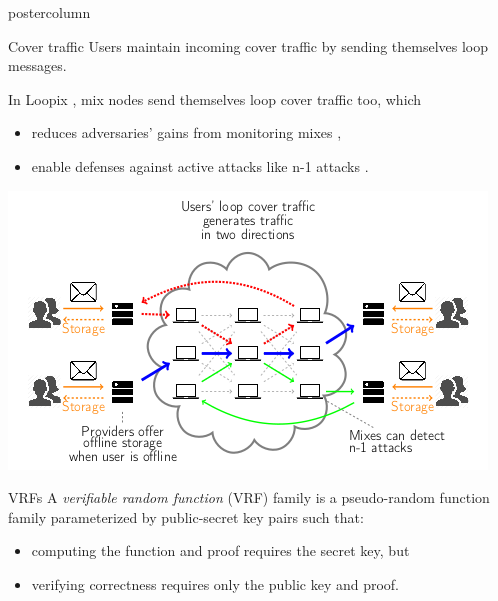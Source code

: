 \documentclass{beamer}
\begin{document}
\begin{frame}
\begin{columns}
\begin{column}{.49\textwidth}
\begin{beamercolorbox}[center,wd=\textwidth]{postercolumn}
\begin{minipage}[T]{.95\textwidth}
{\begin{block}{Cover traffic}
                Users maintain incoming cover traffic by sending themselves loop messages. \\ \bigskip\bigskip

                In Loopix \cite{Loopix}, mix nodes send themselves loop cover traffic too, which \\
                \begin{itemize}
                \item reduces adversaries' gains from monitoring mixes \cite[\S4.1.3: Thm 1 vs 2]{Loopix}, %
                \item enable defenses against active attacks like n-1 attacks \cite[\S4.2.1]{Loopix}.
                \end{itemize}

                \begin{center}
                \includegraphics[trim=0 0 0 50,clip,width=\textwidth]{../talks/pics/loopix/achitecture}
                \end{center}

            \end{block}
            \vfill
            \begin{block}{VRFs}
                A {\em verifiable random function} (VRF) family is a pseudo-random function family parameterized by public-secret key pairs such that: \\
                \begin{itemize}
                \item  computing the function and proof requires the secret key, but
                \item  verifying correctness requires only the public key and proof.
                \end{itemize}
                \bigskip
            \end{block}
          }
        \end{minipage}
      \end{beamercolorbox}
    \end{column}


\end{columns}
\end{frame}
\end{document}
